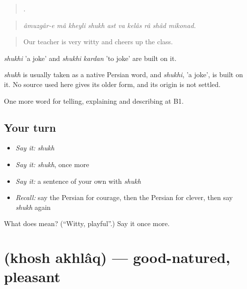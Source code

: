 \begin{quote}
         .
\end{quote}

\begin{quote}
\emph{âmuzgâr-e mâ kheyli shukh ast va kelâs râ shâd mikonad.}
\end{quote}

\begin{quote}
Our teacher is very witty and cheers up the class.
\end{quote}

\emph{shukhi} 'a joke' and \emph{shukhi kardan} 'to joke' are built on it.

\begin{cousinweb}
\emph{shukh} is usually taken as a native Persian word, and \emph{shukhi}, 'a joke', is built on it. No source used here gives its older form, and its origin is not settled.
\end{cousinweb}

\begin{grammarlens}[title={What you've built}]
One more word for telling, explaining and describing at B1.
\end{grammarlens}

\subsection*{Your turn}
\begin{itemize}
\raggedright
  \item \emph{Say it:} \emph{shukh}
  \item \emph{Say it:} \emph{shukh}, once more
  \item \emph{Say it:} a sentence of your own with \emph{shukh}
  \item \emph{Recall:} say the Persian for courage, then the Persian for clever, then say \emph{shukh} again
\end{itemize}

\begin{tcolorbox}[breakable,colback=teal!4,colframe=teal!35!black,title={Before you move on}]
What does  mean? (\textquotedblleft{}Witty, playful\textquotedblright{}.) Say it once more.
\end{tcolorbox}
\section[\texorpdfstring{\fa{خوش} \fa{اخلاق} (khosh akhlâq)}{خوش اخلاق (khosh akhlâq)}]{  (khosh akhlâq) — good-natured, pleasant}

